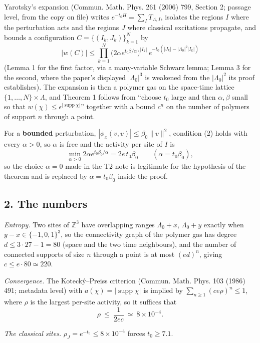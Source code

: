 \documentclass[11pt,a4paper]{article}
\begin{document}
Yarotsky's expansion (Commun. Math. Phys. 261 (2006) 799, Section 2;
passage level, from the copy on file) writes
\(e^{-t_0H}=\sum_IT_{\Lambda,I}\), isolates the regions \(I\) where the
perturbation acts and the regions \(J\) where classical excitations
propagate, and bounds a configuration \(C=\{(I_k,J_k)\}_{k=1}^N\) by
\[|w(C)|\le\prod_{k=1}^N\big(2\alpha e^{t_0\beta/\alpha}\big)^{|I_k|}\,e^{-t_0(|J_k|-|\Lambda_0|^2|I_k|)}\]
(Lemma 1 for the first factor, via a many-variable Schwarz lemma; Lemma
3 for the second, where the paper's displayed \(|\Lambda_0|^3\) is
weakened from the \(|\Lambda_0|^2\) its proof establishes). The
expansion is then a polymer gas on the space-time lattice
\(\{1,\dots,N\}\times\Lambda\), and Theorem 1 follows from ``choose
\(t_0\) large and then \(\alpha,\beta\) small so that
\(w(\chi)\le\epsilon^{|\operatorname{supp}\chi|}\)'' together with a
bound \(c^n\) on the number of polymers of support \(n\) through a
point.

For a \textbf{bounded} perturbation, \(|\phi_x(v,v)|\le\beta_0\|v\|^2\),
condition (2) holds with every \(\alpha>0\), so \(\alpha\) is free and
the activity per site of \(I\) is
\[\min_{\alpha>0}2\alpha e^{t_0\beta_0/\alpha}=2e\,t_0\beta_0\qquad(\alpha=t_0\beta_0),\]
so the choice \(\alpha=0\) made in the T2 note is legitimate for the
hypothesis of the theorem and is replaced by \(\alpha=t_0\beta_0\)
inside the proof.

\hypertarget{the-numbers}{%
\subsection{2. The numbers}\label{the-numbers}}

\emph{Entropy.} Two sites of \(\mathbb Z^3\) have overlapping ranges
\(\Lambda_0+x\), \(\Lambda_0+y\) exactly when \(y-x\in\{-1,0,1\}^3\), so
the connectivity graph of the polymer gas has degree
\(d\le3\cdot27-1=80\) (space and the two time neighbours), and the
number of connected supports of size \(n\) through a point is at most
\((ed)^n\), giving \(c\le e\cdot80\simeq220\).

\emph{Convergence.} The Kotecký--Preiss criterion (Commun. Math. Phys.
103 (1986) 491; metadata level) with
\(a(\chi)=|\operatorname{supp}\chi|\) is implied by
\(\sum_{n\ge1}(ce\rho)^n\le1\), where \(\rho\) is the largest per-site
activity, so it suffices that
\[\rho\ \le\ \frac1{2ec}\ \simeq\ 8\times10^{-4}.\]

\emph{The classical sites.} \(\rho_J=e^{-t_0}\le8\times10^{-4}\) forces
\(t_0\ge7.1\).
\end{document}
